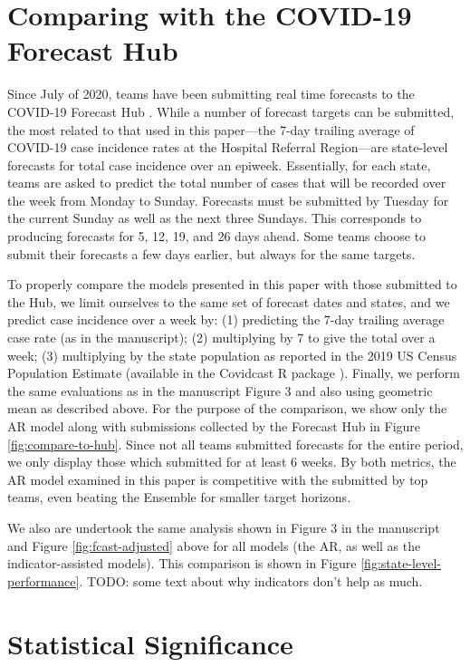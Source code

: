 \section{Comparing with the COVID-19 Forecast Hub}

Since July of 2020, teams have been submitting real time forecasts
to the COVID-19 Forecast Hub \cite{ForecastHub}. While a number of forecast
targets can be submitted, the most related to that used in this paper---the
7-day trailing average of COVID-19 case incidence rates at the Hospital Referral
Region---are state-level forecasts for total case incidence over an epiweek.
Essentially, for each state, teams are asked to predict the total number of
cases that will be recorded over the week from Monday to Sunday. Forecasts must
be submitted by Tuesday for the current Sunday as well as the next three
Sundays. This corresponds to producing forecasts for 5, 12, 19, and 26 days
ahead. Some teams choose to submit their forecasts a few days earlier, but
always for the same targets.

To properly compare the models presented in this paper with those submitted to
the Hub, we limit ourselves to the same set of forecast dates and states, and
we predict case incidence over a week by: (1) predicting the 7-day trailing
average case rate (as in the manuscript);
(2) multiplying by 7 to give the total over a week; (3) multiplying by the state
population as reported in the 2019 US Census Population Estimate (available in
the Covidcast R package \cite{CovidcastR}). Finally, we perform the same
evaluations as in the manuscript Figure 3 and also using geometric mean as
described above.
For the purpose of the comparison, we show only the AR model along with
submissions collected by the Forecast Hub in Figure \ref{fig:compare-to-hub}.
Since not all teams submitted forecasts for the entire period, we
only display those which submitted for at least 6 weeks. By both metrics,
the AR model examined in this paper is competitive with the submitted by top teams, even
beating the Ensemble for smaller target horizons.



We also are undertook the same analysis shown in Figure 3 in the manuscript and Figure
\ref{fig:fcast-adjusted} above for all models
(the AR, as well as the indicator-assisted models). This comparison is shown in Figure
\ref{fig:state-level-performance}. 
%
TODO: some text about why indicators don't help as much.


\section{Statistical Significance}

